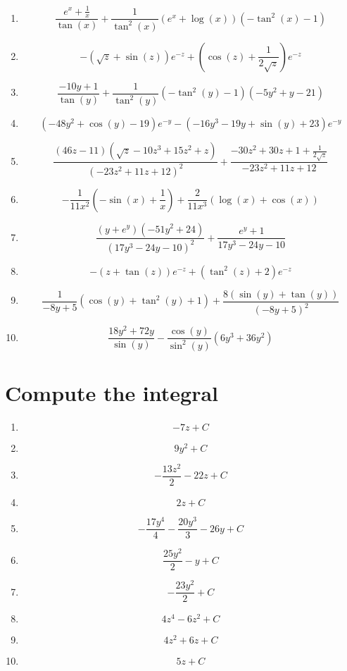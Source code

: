 \documentclass{article}
\begin{document}
        \begin{enumerate}
        \item$$\frac{e^{x} + \frac{1}{x}}{\tan{\left (x \right )}} + \frac{1}{\tan^{2}{\left (x \right )}} \left(e^{x} + \log{\left (x \right )}\right) \left(- \tan^{2}{\left (x \right )} - 1\right)$$
\item$$- \left(\sqrt{z} + \sin{\left (z \right )}\right) e^{- z} + \left(\cos{\left (z \right )} + \frac{1}{2 \sqrt{z}}\right) e^{- z}$$
\item$$\frac{- 10 y + 1}{\tan{\left (y \right )}} + \frac{1}{\tan^{2}{\left (y \right )}} \left(- \tan^{2}{\left (y \right )} - 1\right) \left(- 5 y^{2} + y - 21\right)$$
\item$$\left(- 48 y^{2} + \cos{\left (y \right )} - 19\right) e^{- y} - \left(- 16 y^{3} - 19 y + \sin{\left (y \right )} + 23\right) e^{- y}$$
\item$$\frac{\left(46 z - 11\right) \left(\sqrt{z} - 10 z^{3} + 15 z^{2} + z\right)}{\left(- 23 z^{2} + 11 z + 12\right)^{2}} + \frac{- 30 z^{2} + 30 z + 1 + \frac{1}{2 \sqrt{z}}}{- 23 z^{2} + 11 z + 12}$$
\item$$- \frac{1}{11 x^{2}} \left(- \sin{\left (x \right )} + \frac{1}{x}\right) + \frac{2}{11 x^{3}} \left(\log{\left (x \right )} + \cos{\left (x \right )}\right)$$
\item$$\frac{\left(y + e^{y}\right) \left(- 51 y^{2} + 24\right)}{\left(17 y^{3} - 24 y - 10\right)^{2}} + \frac{e^{y} + 1}{17 y^{3} - 24 y - 10}$$
\item$$- \left(z + \tan{\left (z \right )}\right) e^{- z} + \left(\tan^{2}{\left (z \right )} + 2\right) e^{- z}$$
\item$$\frac{1}{- 8 y + 5} \left(\cos{\left (y \right )} + \tan^{2}{\left (y \right )} + 1\right) + \frac{8 \left(\sin{\left (y \right )} + \tan{\left (y \right )}\right)}{\left(- 8 y + 5\right)^{2}}$$
\item$$\frac{18 y^{2} + 72 y}{\sin{\left (y \right )}} - \frac{\cos{\left (y \right )}}{\sin^{2}{\left (y \right )}} \left(6 y^{3} + 36 y^{2}\right)$$
        \end{enumerate}
        

        \section{Compute the integral}
        
        \begin{enumerate}
        \item$$- 7 z + C $$
\item$$9 y^{2} + C $$
\item$$- \frac{13 z^{2}}{2} - 22 z + C $$
\item$$2 z + C $$
\item$$- \frac{17 y^{4}}{4} - \frac{20 y^{3}}{3} - 26 y + C $$
\item$$\frac{25 y^{2}}{2} - y + C $$
\item$$- \frac{23 y^{2}}{2} + C $$
\item$$4 z^{4} - 6 z^{2} + C $$
\item$$4 z^{2} + 6 z + C $$
\item$$5 z + C $$
        \end{enumerate}
        
\end{document}
